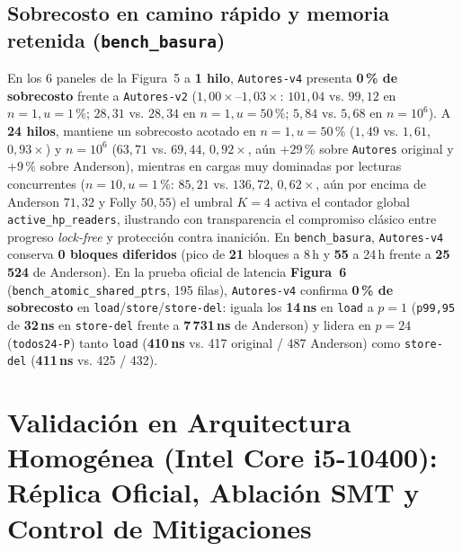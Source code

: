 \documentclass[11pt,a4paper]{article}
\begin{document}
\subsection{Sobrecosto en camino rápido y memoria retenida (\texttt{bench\_basura})}

En los 6 paneles de la Figura~5 a \textbf{1 hilo}, \texttt{Autores-v4} presenta \textbf{0\,\% de sobrecosto} frente a \texttt{Autores-v2} ($1{,}00\times\text{--}1{,}03\times$: $101{,}04$ vs. $99{,}12$ en $n=1, u=1\,\%$; $28{,}31$ vs. $28{,}34$ en $n=1, u=50\,\%$; $5{,}84$ vs. $5{,}68$ en $n=10^6$). A \textbf{24 hilos}, mantiene un sobrecosto acotado en $n=1, u=50\,\%$ ($1{,}49$ vs. $1{,}61$, $0{,}93\times$) y $n=10^6$ ($63{,}71$ vs. $69{,}44$, $0{,}92\times$, aún $+29\,\%$ sobre \texttt{Autores} original y $+9\,\%$ sobre Anderson), mientras en cargas muy dominadas por lecturas concurrentes ($n=10, u=1\,\%$: $85{,}21$ vs. $136{,}72$, $0{,}62\times$, aún por encima de Anderson $71{,}32$ y Folly $50{,}55$) el umbral $K=4$ activa el contador global \texttt{active\_hp\_readers}, ilustrando con transparencia el compromiso clásico entre progreso \emph{lock-free} y protección contra inanición. En \texttt{bench\_basura}, \texttt{Autores-v4} conserva \textbf{0 bloques diferidos} (pico de \textbf{21} bloques a 8\,h y \textbf{55} a 24\,h frente a \textbf{25\,524} de Anderson). En la prueba oficial de latencia \textbf{Figura~6} (\texttt{bench\_atomic\_shared\_ptrs}, 195 filas), \texttt{Autores-v4} confirma \textbf{0\,\% de sobrecosto} en \texttt{load}/\texttt{store}/\texttt{store-del}: iguala los \textbf{14\,ns} en \texttt{load} a $p=1$ (\texttt{p99,95} de \textbf{32\,ns} en \texttt{store-del} frente a \textbf{7\,731\,ns} de Anderson) y lidera en $p=24$ (\texttt{todos24-P}) tanto \texttt{load} (\textbf{410\,ns} vs. 417 original / 487 Anderson) como \texttt{store-del} (\textbf{411\,ns} vs. 425 / 432).


\section{Validación en Arquitectura Homogénea (Intel Core i5-10400): Réplica Oficial, Ablación SMT y Control de Mitigaciones}
\end{document}
